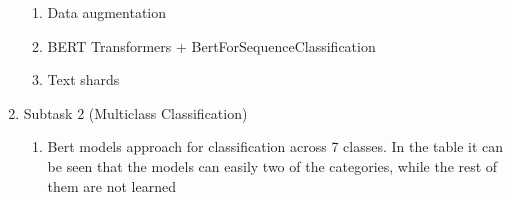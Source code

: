 \documentclass[11pt]{article}
\begin{document}
\begin{enumerate}
\begin{enumerate}
		      \item Data augmentation


		      \item BERT Transformers + BertForSequenceClassification


		      \item Text shards

	      \end{enumerate}

	\item Subtask 2 (Multiclass Classification)

	      \begin{enumerate}
		      \item Bert models approach for classification across 7 classes. In the table it
                      can be seen that the models can easily two of the categories,
                      while the rest of them are not learned


\end{enumerate}
\end{enumerate}
\end{document}
